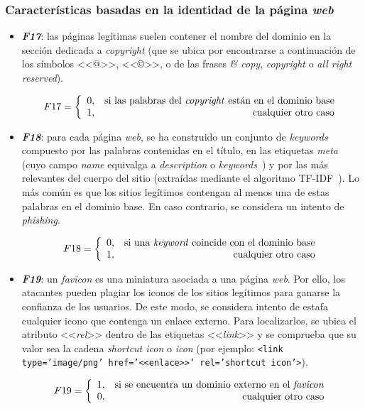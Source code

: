 \subsubsection{Características basadas en la identidad de la página \textit{web}}

\begin{itemize}
	\item \textit{\textbf{F17}}: las páginas legítimas suelen contener el nombre del dominio en la sección dedicada a \textit{copyright} (que se ubica por encontrarse a continuación de los símbolos <<@>>, <<©>>, o de las frases \textit{\& copy}, \textit{copyright} o \textit{all right reserved}).

	\[F17 = \left\{ \begin{array}{lr} 0, & \text{si las palabras del \textit{copyright} están en el dominio base}\\
	1, & \text{\raggedright cualquier otro caso} \label{eqn:phishing_f17} \end{array}\right.\]
	
	\item \textit{\textbf{F18}}: para cada página \textit{web}, se ha construido un conjunto de \textit{keywords} compuesto por las palabras contenidas en el título, en las etiquetas \textit{meta} (cuyo campo \textit{name} equivalga a \textit{description} o \textit{keywords}~\cite{metatags}) y por las más relevantes del cuerpo del sitio (extraídas mediante el algoritmo TF-IDF~\cite{cantinatfidf}). Lo más común es que los sitios legítimos contengan al menos una de estas palabras en el dominio base. En caso contrario, se considera un intento de \textit{phishing}.
	
	\[F18 = \left\{ \begin{array}{lr} 0, & \text{si una \textit{keyword} coincide con el dominio base}\\
	1, & \text{\raggedright cualquier otro caso} \label{eqn:phishing_f18} \end{array}\right.\]
	
	\item \textit{\textbf{F19}}: un \textit{favicon} es una miniatura asociada a una página \textit{web}. Por ello, los atacantes pueden plagiar los iconos de los sitios legítimos para ganarse la confianza de los usuarios. De este modo, se considera intento de estafa cualquier icono que contenga un enlace externo. Para localizarlos, se ubica el atributo <<\textit{rel}>> dentro de las etiquetas <<\textit{link}>> y se comprueba que su valor sea la cadena \textit{shortcut icon} o \textit{icon}  (por ejemplo: \texttt{<link type='image/png' href='<<enlace>>' rel='shortcut icon'>}).
	
	\[F19 = \left\{ \begin{array}{lr} 1, & \text{si se encuentra un dominio externo en el \textit{favicon}}\\
	0, & \text{\raggedright cualquier otro caso} \label{eqn:phishing_f19} \end{array}\right.\]
\end{itemize}




